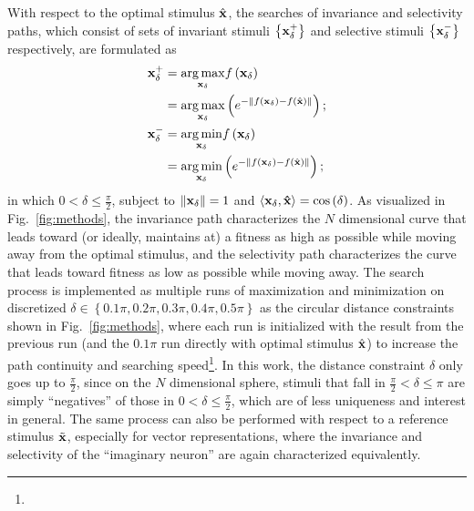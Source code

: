 \documentclass[10pt,twocolumn,letterpaper]{article}
\begin{document}
With respect to the optimal stimulus $\hat{\bf{x}}$, the searches of invariance and selectivity paths, which consist of sets of invariant stimuli $\left\lbrace \bf{x}^{+}_{\delta} \right\rbrace$ and selective stimuli $\left\lbrace \bf{x}^{-}_{\delta} \right\rbrace$ respectively, are formulated as
\begin{align}
\bf{x}^{+}_{\delta} &= \underset{\bf{x}_{\delta}}{\arg\max} f\left(\bf{x}_{\delta}\right) \label{eq:I1} \\
&= \underset{\bf{x}_{\delta}}{\arg\max} \left( e^{-\left\|f\left(\bf{x}_{\delta}\right)-f\left(\hat{\bf{x}}\right)\right\|} \right); \label{eq:I2} \\
\bf{x}^{-}_{\delta} &= \underset{\bf{x}_{\delta}}{\arg\min} f\left(\bf{x}_{\delta}\right) \label{eq:S1} \\
&= \underset{\bf{x}_{\delta}}{\arg\min} \left( e^{-\left\|f\left(\bf{x}_{\delta}\right)-f\left(\hat{\bf{x}}\right)\right\|} \right); \label{eq:S2}
\end{align}
in which $0 < \delta \le \frac{\pi}{2}$, subject to $\left\| \bf{x}_{\delta} \right\| = 1$ and $\langle \bf{x}_{\delta} , \hat{\bf{x}} \rangle = \cos\left(\delta\right)$. 
As visualized in Fig.~\ref{fig:methods}, the invariance path characterizes the $N$ dimensional curve that leads toward (or ideally, maintains at) a fitness as high as possible while moving away from the optimal stimulus, and the selectivity path characterizes the curve that leads toward fitness as low as possible while moving away.
The search process is implemented as multiple runs of maximization and minimization on discretized $\delta \in \left\lbrace 0.1\pi, 0.2\pi, 0.3\pi, 0.4\pi, 0.5\pi\right\rbrace$ as the circular distance constraints shown in Fig.~\ref{fig:methods}, where each run is initialized with the result from the previous run (and the $0.1\pi$ run directly with optimal stimulus $\hat{\bf{x}}$) to increase the path continuity and searching speed\footnote{\expdiff}.
In this work, the distance constraint $\delta$ only goes up to $\frac{\pi}{2}$, since on the $N$ dimensional sphere, stimuli that fall in $\frac{\pi}{2} < \delta \le \pi$ are simply ``negatives'' of those in $0 < \delta \le \frac{\pi}{2}$, which are of less uniqueness and interest in general. 
The same process can also be performed with respect to a reference stimulus $\tilde{\bf{x}}$, especially for vector representations, where the invariance and selectivity of the ``imaginary neuron'' are again characterized equivalently.

\end{document}
